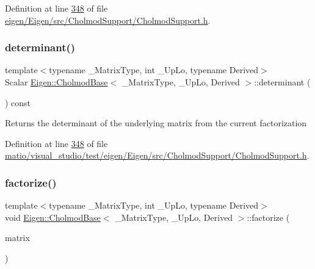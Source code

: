 Definition at line \hyperlink{eigen_2_eigen_2src_2_cholmod_support_2_cholmod_support_8h_source_l00348}{348} of file \hyperlink{eigen_2_eigen_2src_2_cholmod_support_2_cholmod_support_8h_source}{eigen/\+Eigen/src/\+Cholmod\+Support/\+Cholmod\+Support.\+h}.

\mbox{\label{class_eigen_1_1_cholmod_base_ab4ffb4a9735ad7e81a01d5789ce96547}} 
\subsubsection{\texorpdfstring{determinant()}{determinant()}\hspace{0.1cm}{\footnotesize\ttfamily [2/2]}}
{\footnotesize\ttfamily template$<$typename \+\_\+\+Matrix\+Type, int \+\_\+\+Up\+Lo, typename Derived$>$ \\
Scalar \hyperlink{class_eigen_1_1_cholmod_base}{Eigen\+::\+Cholmod\+Base}$<$ \+\_\+\+Matrix\+Type, \+\_\+\+Up\+Lo, Derived $>$\+::determinant (\begin{DoxyParamCaption}{ }\end{DoxyParamCaption}) const\hspace{0.3cm}{\ttfamily [inline]}}

\begin{DoxyReturn}{Returns}
the determinant of the underlying matrix from the current factorization 
\end{DoxyReturn}


Definition at line \hyperlink{matio_2visual__studio_2test_2eigen_2_eigen_2src_2_cholmod_support_2_cholmod_support_8h_source_l00348}{348} of file \hyperlink{matio_2visual__studio_2test_2eigen_2_eigen_2src_2_cholmod_support_2_cholmod_support_8h_source}{matio/visual\+\_\+studio/test/eigen/\+Eigen/src/\+Cholmod\+Support/\+Cholmod\+Support.\+h}.

\mbox{\label{class_eigen_1_1_cholmod_base_a5bd9c9ec4d1c15f202a6c66b5e9ef37b}} 
\subsubsection{\texorpdfstring{factorize()}{factorize()}\hspace{0.1cm}{\footnotesize\ttfamily [1/2]}}
{\footnotesize\ttfamily template$<$typename \+\_\+\+Matrix\+Type, int \+\_\+\+Up\+Lo, typename Derived$>$ \\
void \hyperlink{class_eigen_1_1_cholmod_base}{Eigen\+::\+Cholmod\+Base}$<$ \+\_\+\+Matrix\+Type, \+\_\+\+Up\+Lo, Derived $>$\+::factorize (\begin{DoxyParamCaption}\item[{const Matrix\+Type \&}]{matrix }\end{DoxyParamCaption})\hspace{0.3cm}{\ttfamily [inline]}}

